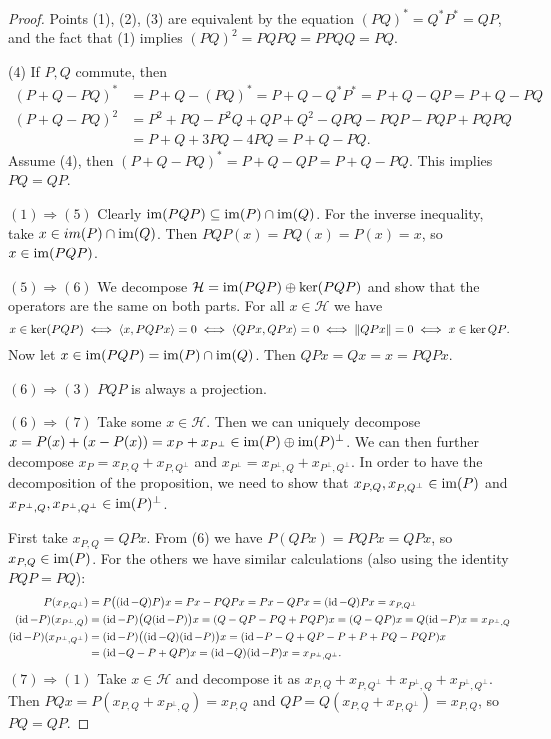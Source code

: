 \begin{proof}
Points (1), (2), (3) are equivalent by the equation $(PQ)^* = Q^*P^* = QP$, and the fact that (1) implies $(PQ)^2 = PQPQ = PPQQ = PQ$.

(4) If $P,Q$ commute, then
\begin{align*}
(P+Q-PQ)^* &= P+Q-(PQ)^* = P+Q-Q^*P^* =P+Q-QP = P+Q-PQ \\
(P+Q-PQ)^2 &= P^2 + PQ -P^2Q + QP+Q^2 - QPQ - PQP -PQP +PQPQ \\
&= P + Q + 3PQ - 4PQ= P+Q-PQ.
\end{align*}
Assume (4), then $(P+Q-PQ)^* = P+Q-QP = P+Q-PQ$. This implies $PQ=QP$.

$\boxed{(1)\Rightarrow (5)}$ Clearly $\operatorname{im}(PQP) \subseteq \operatorname{im}(P) \cap \operatorname{im}(Q)$.
For the inverse inequality, take $x\in im(P)\cap\operatorname{im}(Q)$. Then $PQP(x) = PQ(x) = P(x) = x$, so $x\in\operatorname{im}(PQP)$.

$\boxed{(5)\Rightarrow (6)}$ We decompose $\mathcal{H} = \operatorname{im}(PQP) \oplus \ker(PQP)$ and show that the operators are the same on both parts. For all $x\in \mathcal{H}$ we have
\[ x\in \ker(PQP) \iff \left\langle x,PQPx \right\rangle = 0 \iff \left\langle QPx,QPx \right\rangle = 0 \iff \lVert QPx\rVert = 0 \iff x\in\ker{QP}.  \]
Now let $x\in\operatorname{im}(PQP) = \operatorname{im}(P)\cap\operatorname{im}(Q)$. Then $QPx = Qx = x = PQPx$.

$\boxed{(6)\Rightarrow (3)}$ $PQP$ is always a projection.

$\boxed{(6)\Rightarrow (7)}$ Take some $x\in \mathcal{H}$. Then we can uniquely decompose $x = P(x) + (x-P(x)) = x_P + x_{P^\perp} \in \operatorname{im}(P)\oplus \operatorname{im}(P)^\perp$. We can then further decompose $x_P = x_{P,Q} + x_{P,Q^\perp}$ and $x_{P^\perp} = x_{P^\perp, Q} + x_{P^\perp, Q^\perp}$. In order to have the decomposition of the proposition, we need to show that $x_{P,Q},x_{P,Q^\perp}\in \operatorname{im}(P)$ and $x_{P^\perp, Q},x_{P^\perp, Q^\perp}\in\operatorname{im}(P)^\perp$.

First take $x_{P,Q} = QPx$. From (6) we have $P(QPx) = PQPx = QPx$, so $x_{P,Q}\in \operatorname{im}(P)$. For the others we have similar calculations (also using the identity $PQP = PQ$):
\begin{align*}
P(x_{P,Q^\perp}) &= P\big((\operatorname{id}-Q)P\big)x = Px - PQPx = Px - QPx = (\operatorname{id}-Q)Px = x_{P,Q^\perp} \\
(\operatorname{id}-P)(x_{P^\perp,Q}) &= (\operatorname{id}-P)\big(Q(\operatorname{id}-P)\big)x = (Q-QP-PQ+PQP)x = (Q-QP)x = Q(\operatorname{id}-P)x = x_{P^\perp,Q} \\
(\operatorname{id}-P)(x_{P^\perp,Q^\perp}) &= (\operatorname{id}-P)\big((\operatorname{id}-Q)(\operatorname{id}-P)\big)x = (\operatorname{id}-P-Q+QP-P+P+PQ-PQP)x \\
&= (\operatorname{id}-Q-P+QP)x = (\operatorname{id}-Q)(\operatorname{id}-P)x = x_{P^\perp,Q^\perp}.
\end{align*}
$\boxed{(7)\Rightarrow (1)}$ Take $x\in \mathcal{H}$ and decompose it as $x_{P,Q} + x_{P,Q^\perp} + x_{P^\perp, Q} + x_{P^\perp, Q^\perp}$. Then $PQx = P(x_{P,Q} + x_{P^\perp, Q}) = x_{P,Q}$ and $QP = Q(x_{P,Q} + x_{P, Q^\perp}) = x_{P,Q}$, so $PQ = QP$. 
\end{proof}

